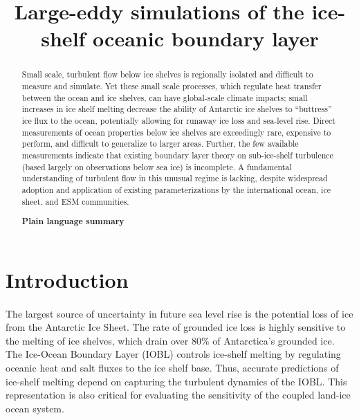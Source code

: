 \documentclass[draft]{styles/agujournal2019}
\begin{document}
%
\title{Large-eddy simulations of the ice-shelf oceanic boundary layer}

	

\begin{keypoints}
\item 
\item 
\item 
\end{keypoints}

\begin{abstract}
Small scale, turbulent flow below ice shelves is regionally isolated and difficult to measure and simulate.  Yet these small scale processes, which regulate heat transfer between the ocean and ice shelves, can have global-scale climate impacts; small increases in ice shelf melting decrease the ability of Antarctic ice shelves to “buttress” ice flux to the ocean, potentially allowing for runaway ice loss and sea-level rise. Direct measurements of ocean properties below ice shelves are exceedingly rare, expensive to perform, and difficult to generalize to larger areas. Further, the few available measurements indicate that existing boundary layer theory on sub-ice-shelf turbulence (based largely on observations below sea ice) is incomplete. A fundamental understanding of turbulent flow in this unusual regime is lacking, despite widespread adoption and application of existing parameterizations by the international ocean, ice sheet, and ESM communities.
    
\textbf{Plain language summary}\\
    
\end{abstract}
\newpage
\section{Introduction}

\paragraph{}
The largest source of uncertainty in future sea level rise is the potential loss of ice from the Antarctic Ice Sheet. The rate of grounded ice loss is highly sensitive to the melting of ice shelves, which drain over 80\% of Antarctica’s grounded ice. The Ice-Ocean Boundary Layer (IOBL) controls ice-shelf melting by regulating oceanic heat and salt fluxes to the ice shelf base. Thus, accurate predictions of ice-shelf melting depend on capturing the turbulent dynamics of the IOBL. This representation is also critical for evaluating the sensitivity of the coupled land-ice ocean system. 
\end{document}
